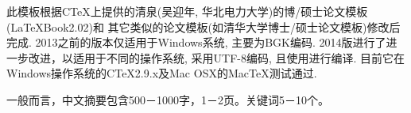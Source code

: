 此模板根据CTeX上提供的清泉(吴迎年, 华北电力大学)的博/硕士论文模板(LaTeXBook2.02)和
其它类似的论文模板(如清华大学博士/硕士论文模板)修改后完成. 2013之前的版本仅适用于Windows系统, 主要为BGK编码. 
2014版进行了进一步改进，以适用于不同的操作系统, 采用UTF-8编码, 且使用\XeLaTeX{}进行编译. 
目前它在Windows操作系统的CTeX2.9.x及Mac OSX的MacTeX测试通过. 

一般而言，中文摘要包含500－1000字，1－2页。关键词5－10个。


